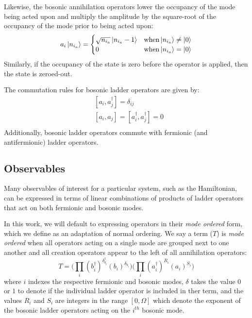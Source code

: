 Likewise, the bosonic annihilation operators lower the occupancy of the mode being acted upon and multiply the amplitude by the square-root of the occupancy of the mode prior to being acted upon:
\begin{equation}
    \label{eq:bosonic-annihilation}
    a_i \ket{n_{i_a}} = 
    \begin{cases} 
        \sqrt{n_{i_a}} \ket{n_{i_a} - 1}  & {\rm when} \ket{n_{i_a}} \neq \ket{0} \\
        0 & {\rm when} \ket{n_{i_a}} = \ket{0}
    \end{cases}
\end{equation}
Similarly, if the occupancy of the state is zero before the operator is applied, then the state is zeroed-out.

The commutation rules for bosonic ladder operators are given by:
\begin{equation}
    \label{eq:bosonic-commutation}
    \begin{split}
        &[a_i, a_j^\dagger] = \delta_{ij}\\
        & [a_i, a_j] = [a_i^\dagger, a_j^\dagger] = 0 \\
    \end{split}
\end{equation}
Additionally, bosonic ladder operators commute with fermionic (and antifermionic) ladder operators.

\subsection{Observables}
\label{subsec:observables}

Many observables of interest for a particular system, such as the Hamiltonian, can be expressed in terms of linear combinations of products of ladder operators that act on both fermionic and bosonic modes.

In this work, we will default to expressing operators in their \emph{mode ordered} form, which we define as an adaptation of normal ordering.
We say a term ($T$) is \textit{mode ordered} when all operators acting on a single mode are grouped next to one another and all creation operators appear to the left of all annihilation operators:
\begin{equation}
    \label{eq:mode-ordered}
    T = \Big( \prod_i (b_i^\dagger)^{\delta_{b_i}^{\dagger}} (b_i)^{\delta_{b_i}} \Big) \Big( \prod_i (a_i^\dagger)^{R_i}(a_i)^{S_i} \Big) 
\end{equation}
where $i$ indexes the respective fermionic and bosonic modes, $\delta$ takes the value $0$ or $1$ to denote if the individual ladder operator is included in ther term, and the values $R_i$ and $S_i$ are integers in the range $[0, \Omega]$ which denote the exponent of the bosonic ladder operators acting on the $i^{th}$ bosonic mode.

